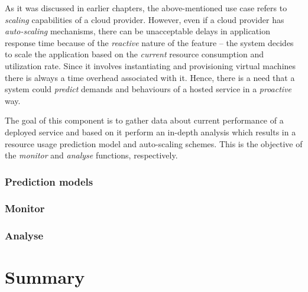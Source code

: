 As it was discussed in earlier chapters, the above-mentioned use case refers to \emph{scaling} capabilities of a cloud provider. However, even if a cloud provider has \emph{auto-scaling} mechanisms, there can be unacceptable delays in application response time because of the \emph{reactive} nature of the feature -- the system decides to scale the application based on the \emph{current} resource consumption and utilization rate. Since it involves instantiating and provisioning virtual machines there is always a time overhead associated with it. Hence, there is a need that a system could \emph{predict} demands and behaviours of a hosted service in a \emph{proactive} way. 

The goal of this component is to gather data about current performance of a deployed service and based on it perform an in-depth analysis which results in a resource usage prediction model and auto-scaling schemes. This is the objective of the \emph{monitor} and \emph{analyse} functions, respectively.

\subsubsection*{Prediction models}
\subsubsection{Monitor}
\subsubsection{Analyse}

\section{Summary}
